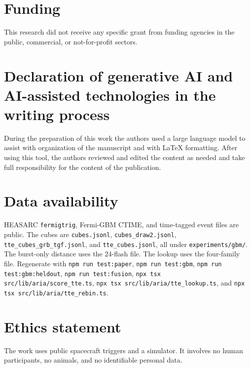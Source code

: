 \documentclass[preprint,12pt]{elsarticle}
\begin{document}
\section*{Funding}

This research did not receive any specific grant from funding agencies in the public, commercial, or not-for-profit sectors.

\section*{Declaration of generative AI and AI-assisted technologies in the writing process}

During the preparation of this work the authors used a large language model to assist with organization of the manuscript and with LaTeX formatting. After using this tool, the authors reviewed and edited the content as needed and take full responsibility for the content of the publication.

\section*{Data availability}

\begin{sloppypar}
HEASARC \texttt{fermigtrig}, Fermi-GBM CTIME, and time-tagged event files are public.
The cubes are \texttt{cubes.jsonl}, \texttt{cubes\_draw2.jsonl}, \texttt{tte\_cubes\_grb\_tgf.jsonl}, and \texttt{tte\_cubes.jsonl}, all under \texttt{experiments/gbm/}.
The burst-only distance uses the 24-flash file. The lookup uses the four-family file.
Regenerate with \texttt{npm run test:paper}, \texttt{npm run test:gbm}, \texttt{npm run test:gbm:heldout}, \texttt{npm run test:fusion}, \texttt{npx tsx src/lib/aria/score\_tte.ts}, \texttt{npx tsx src/lib/aria/tte\_lookup.ts}, and \texttt{npx tsx src/lib/aria/tte\_rebin.ts}.
\end{sloppypar}

\section*{Ethics statement}

The work uses public spacecraft triggers and a simulator. It involves no human participants, no animals, and no identifiable personal data.
\end{document}
